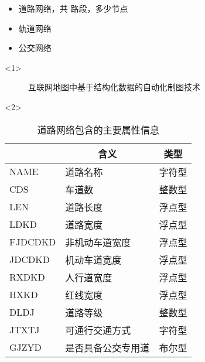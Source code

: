 \begin{frame}[t]{\subsecname}
\begin{itemize}
\item<1-> 道路网络，共 路段，多少节点   
\item<3-> 轨道网络
\item<4-> 公交网络
\end{itemize}

\begin{overlayarea}{\textwidth}{\textheight}
  \begin{onlyenv}<1>
\begin{figure}\centering
    \vspace{1pt} 
    \caption{互联网地图中基于结构化数据的自动化制图技术}
\end{figure}
  \end{onlyenv}

  \begin{onlyenv}<2>
\begin{table} \centering \scriptsize
  \renewcommand\arraystretch{0.9}
  \begin{tabular}{|m{}|m{}|m{}|}
    \toprule
    \rowcolor{LightCyan}
\multicolumn{1}{|c|}{\textbf{属性名称}} & \multicolumn{1}{c|}{\textbf{含义}} & \multicolumn{1}{c|}{\textbf{类型}}\\\hline
    NAME & 道路名称 & 字符型 \\\hline
    CDS & 车道数 & 整数型 \\\hline
    LEN & 道路长度 & 浮点型 \\\hline
    LDKD & 道路宽度 & 浮点型 \\\hline
    FJDCDKD & 非机动车道宽度 & 浮点型 \\\hline
    JDCDKD & 机动车道宽度 & 浮点型 \\\hline
    RXDKD & 人行道宽度 & 浮点型 \\\hline
    HXKD & 红线宽度 & 浮点型 \\\hline
    DLDJ & 道路等级 & 整数型 \\\hline
    JTXTJ & 可通行交通方式 & 字符型 \\\hline
    GJZYD & 是否具备公交专用道 & 布尔型 \\
    \bottomrule
  \end{tabular}
\caption{道路网络包含的主要属性信息}
\end{table}
  \end{onlyenv}
\end{overlayarea}

\end{frame}

